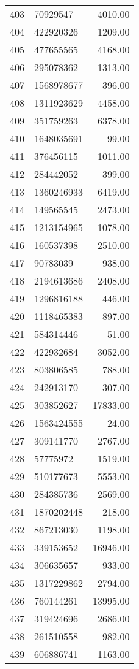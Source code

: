 \begin{table}[ht]
\begin{tabular}{rlr}
  403 & 70929547 & 4010.00 \\ 
  404 & 422920326 & 1209.00 \\ 
  405 & 477655565 & 4168.00 \\ 
  406 & 295078362 & 1313.00 \\ 
  407 & 1568978677 & 396.00 \\ 
  408 & 1311923629 & 4458.00 \\ 
  409 & 351759263 & 6378.00 \\ 
  410 & 1648035691 & 99.00 \\ 
  411 & 376456115 & 1011.00 \\ 
  412 & 284442052 & 399.00 \\ 
  413 & 1360246933 & 6419.00 \\ 
  414 & 149565545 & 2473.00 \\ 
  415 & 1213154965 & 1078.00 \\ 
  416 & 160537398 & 2510.00 \\ 
  417 & 90783039 & 938.00 \\ 
  418 & 2194613686 & 2408.00 \\ 
  419 & 1296816188 & 446.00 \\ 
  420 & 1118465383 & 897.00 \\ 
  421 & 584314446 & 51.00 \\ 
  422 & 422932684 & 3052.00 \\ 
  423 & 803806585 & 788.00 \\ 
  424 & 242913170 & 307.00 \\ 
  425 & 303852627 & 17833.00 \\ 
  426 & 1563424555 & 24.00 \\ 
  427 & 309141770 & 2767.00 \\ 
  428 & 57775972 & 1519.00 \\ 
  429 & 510177673 & 5553.00 \\ 
  430 & 284385736 & 2569.00 \\ 
  431 & 1870202448 & 218.00 \\ 
  432 & 867213030 & 1198.00 \\ 
  433 & 339153652 & 16946.00 \\ 
  434 & 306635657 & 933.00 \\ 
  435 & 1317229862 & 2794.00 \\ 
  436 & 760144261 & 13995.00 \\ 
  437 & 319424696 & 2686.00 \\ 
  438 & 261510558 & 982.00 \\ 
  439 & 606886741 & 1163.00 \\ 

\end{tabular}
\end{table}

